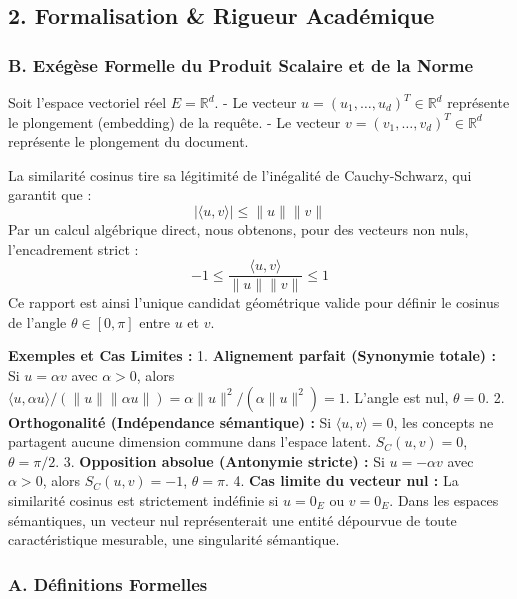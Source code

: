 \documentclass[11pt,a4paper]{report}
\begin{document}
\hypertarget{formalisation-rigueur-acaduxe9mique}{%
\subsection{2. Formalisation \& Rigueur
Académique}\label{formalisation-rigueur-acaduxe9mique}}

\hypertarget{b.-exuxe9guxe8se-formelle-du-produit-scalaire-et-de-la-norme}{%
\subsubsection{B. Exégèse Formelle du Produit Scalaire et de la
Norme}\label{b.-exuxe9guxe8se-formelle-du-produit-scalaire-et-de-la-norme}}

Soit l'espace vectoriel réel \(E = \mathbb{R}^d\). - Le vecteur
\(u = (u_1, \dots, u_d)^T \in \mathbb{R}^d\) représente le plongement
(embedding) de la requête. - Le vecteur
\(v = (v_1, \dots, v_d)^T \in \mathbb{R}^d\) représente le plongement du
document.

La similarité cosinus tire sa légitimité de l'inégalité de
Cauchy-Schwarz, qui garantit que :
\[ |\langle u, v \rangle| \le \|u\| \|v\| \] Par un calcul algébrique
direct, nous obtenons, pour des vecteurs non nuls, l'encadrement strict
: \[ -1 \le \frac{\langle u, v \rangle}{\|u\| \|v\|} \le 1 \] Ce rapport
est ainsi l'unique candidat géométrique valide pour définir le cosinus
de l'angle \(\theta \in [0, \pi]\) entre \(u\) et \(v\).

\textbf{Exemples et Cas Limites :} 1. \textbf{Alignement parfait
(Synonymie totale) :} Si \(u = \alpha v\) avec \(\alpha > 0\), alors
\(\langle u, \alpha u \rangle / (\|u\| \|\alpha u\|) = \alpha \|u\|^2 / (\alpha \|u\|^2) = 1\).
L'angle est nul, \(\theta = 0\). 2. \textbf{Orthogonalité (Indépendance
sémantique) :} Si \(\langle u, v \rangle = 0\), les concepts ne
partagent aucune dimension commune dans l'espace latent.
\(S_C(u, v) = 0\), \(\theta = \pi/2\). 3. \textbf{Opposition absolue
(Antonymie stricte) :} Si \(u = -\alpha v\) avec \(\alpha > 0\), alors
\(S_C(u, v) = -1\), \(\theta = \pi\). 4. \textbf{Cas limite du vecteur
nul :} La similarité cosinus est strictement indéfinie si \(u = 0_E\) ou
\(v = 0_E\). Dans les espaces sémantiques, un vecteur nul représenterait
une entité dépourvue de toute caractéristique mesurable, une singularité
sémantique.

\hypertarget{a.-duxe9finitions-formelles}{%
\subsubsection{A. Définitions
Formelles}\label{a.-duxe9finitions-formelles}}
\end{document}
